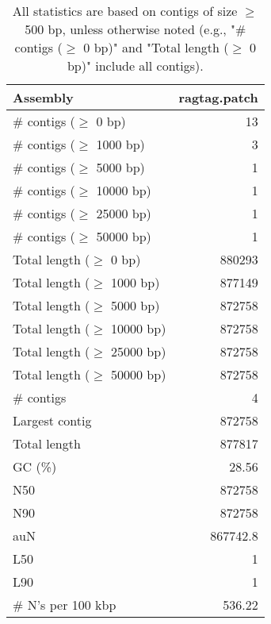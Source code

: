 \documentclass[12pt,a4paper]{article}
\begin{document}
\begin{table}[ht]
\begin{center}
\caption{All statistics are based on contigs of size $\geq$ 500 bp, unless otherwise noted (e.g., "\# contigs ($\geq$ 0 bp)" and "Total length ($\geq$ 0 bp)" include all contigs).}
\begin{tabular}{|l*{1}{|r}|}
\hline
Assembly & ragtag.patch \\ \hline
\# contigs ($\geq$ 0 bp) & 13 \\ \hline
\# contigs ($\geq$ 1000 bp) & 3 \\ \hline
\# contigs ($\geq$ 5000 bp) & 1 \\ \hline
\# contigs ($\geq$ 10000 bp) & 1 \\ \hline
\# contigs ($\geq$ 25000 bp) & 1 \\ \hline
\# contigs ($\geq$ 50000 bp) & 1 \\ \hline
Total length ($\geq$ 0 bp) & 880293 \\ \hline
Total length ($\geq$ 1000 bp) & 877149 \\ \hline
Total length ($\geq$ 5000 bp) & 872758 \\ \hline
Total length ($\geq$ 10000 bp) & 872758 \\ \hline
Total length ($\geq$ 25000 bp) & 872758 \\ \hline
Total length ($\geq$ 50000 bp) & 872758 \\ \hline
\# contigs & 4 \\ \hline
Largest contig & 872758 \\ \hline
Total length & 877817 \\ \hline
GC (\%) & 28.56 \\ \hline
N50 & 872758 \\ \hline
N90 & 872758 \\ \hline
auN & 867742.8 \\ \hline
L50 & 1 \\ \hline
L90 & 1 \\ \hline
\# N's per 100 kbp & 536.22 \\ \hline
\end{tabular}
\end{center}
\end{table}
\end{document}
